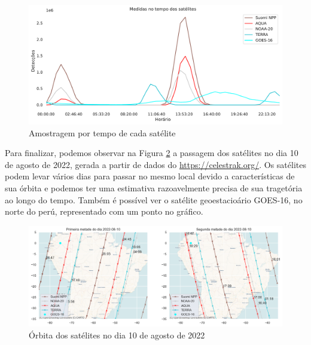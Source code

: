 \documentclass[cic,tc]{iiufrgs}
\begin{document}
\begin{figure}
    \caption{Amostragem por tempo de cada satélite}
    \begin{center}
        \includegraphics[width=35em]{tempo_medidas_satelites}
    \end{center}
    \label{fig:tempo_medidas_satelites}
\end{figure}

Para finalizar, podemos observar na Figura \ref{fig:orbita2022-08-10} a passagem 
dos satélites no dia 10 de agosto de 2022, gerada a partir de 
dados do \url{https://celestrak.org/}. Os satélites podem levar 
vários dias para passar no mesmo local devido a características de sua órbita e 
podemos ter uma estimativa razoavelmente precisa de sua tragetória ao longo do 
tempo. Também é possível ver o satélite geoestacioário GOES-16, no norte 
do perú, representado com um ponto no gráfico. \par

\begin{figure}
    \caption{Órbita dos satélites no dia 10 de agosto de 2022}
    \begin{center}
        \includegraphics[width=35em]{orbita2022-08-10}
    \end{center}
    \label{fig:orbita2022-08-10}
\end{figure}
\end{document}
